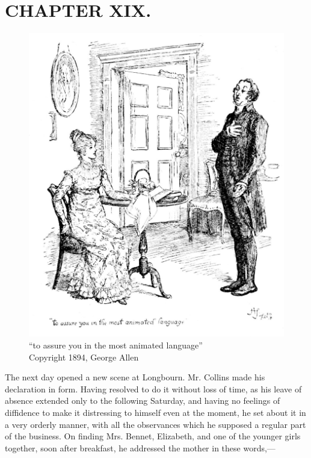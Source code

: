 \chapter{CHAPTER XIX.}

\begin{figure}[htbp]
    \centering
    \includegraphics[width=\textwidth]{illustrations/i_161_a.jpg}
    \caption{“to assure you in the most animated language”\\ Copyright 1894, George Allen}
    \label{fig:image}
\end{figure}


The next day opened a new scene at Longbourn. Mr. Collins made his declaration in form. Having resolved to do it without loss of time, as his leave of absence extended only to the following Saturday, and having no feelings of diffidence to make it distressing to himself even at the moment, he set about it in a very orderly manner, with all the observances which he supposed a regular part of the business. On finding Mrs. Bennet, Elizabeth, and one of the younger girls together, soon after breakfast, he addressed the mother in these words,---

